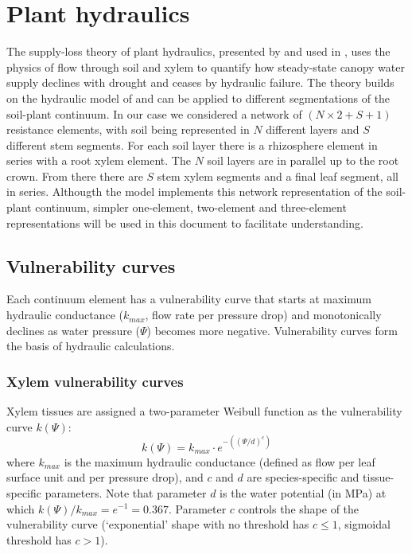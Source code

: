 \documentclass[]{book}
\begin{document}
\hypertarget{plant-hydraulics}{%
\chapter{Plant hydraulics}\label{plant-hydraulics}}

The supply-loss theory of plant hydraulics, presented by \citet{Sperry2016} and used in \citet{Sperry2016}, uses the physics of flow through soil and xylem to quantify how steady-state canopy water supply declines with drought and ceases by hydraulic failure. The theory builds on the hydraulic model of \citet{Sperry1998} and can be applied to different segmentations of the soil-plant continuum. In our case we considered a network of \((N \times 2 + S + 1)\) resistance elements, with soil being represented in \(N\) different layers and \(S\) different stem segments. For each soil layer there is a rhizosphere element in series with a root xylem element. The \(N\) soil layers are in parallel up to the root crown. From there there are \(S\) stem xylem segments and a final leaf segment, all in series. Althougth the model implements this network representation of the soil-plant continuum, simpler one-element, two-element and three-element representations will be used in this document to facilitate understanding.

\hypertarget{vulnerability-curves}{%
\section{Vulnerability curves}\label{vulnerability-curves}}

Each continuum element has a vulnerability curve that starts at maximum hydraulic conductance (\(k_{max}\), flow rate per pressure drop) and monotonically declines as water pressure (\(\Psi\)) becomes more negative. Vulnerability curves form the basis of hydraulic calculations.

\hypertarget{xylem-vulnerability-curves}{%
\subsection{Xylem vulnerability curves}\label{xylem-vulnerability-curves}}

Xylem tissues are assigned a two-parameter Weibull function as the vulnerability curve \(k(\Psi)\):
\begin{equation}
k(\Psi) = k_{max}\cdot e^{-((\Psi/d)^c)}
\label{eq:xylemvulnerability}
\end{equation}
where \(k_{max}\) is the maximum hydraulic conductance (defined as flow per leaf surface unit and per pressure drop), and \(c\) and \(d\) are species-specific and tissue-specific parameters. Note that parameter \(d\) is the water potential (in MPa) at which \(k(\Psi)/k_{max} = e^{-1} = 0.367\). Parameter \(c\) controls the shape of the vulnerability curve (`exponential' shape with no threshold has \(c \leq 1\), sigmoidal threshold has \(c > 1\)).
\end{document}
